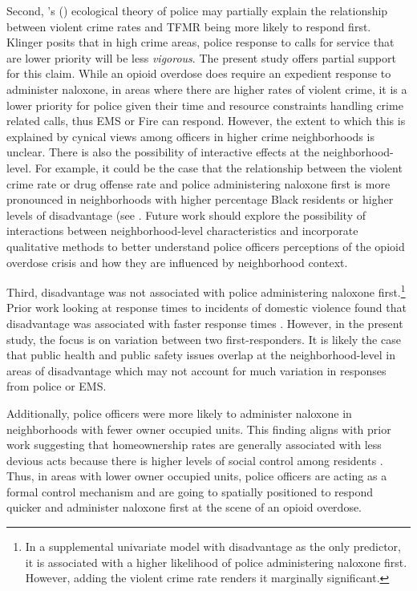 Second, \citeauthor{klinger_negotiating_1997}'s (\citeyear{klinger_negotiating_1997}) ecological theory of police may partially explain the relationship between violent crime rates and TFMR being more likely to respond first. Klinger posits that in high crime areas, police response to calls for service that are lower priority will be less \textit{vigorous}. The present study offers partial support for this claim. While an opioid overdose does require an expedient response to administer naloxone, in areas where there are higher rates of violent crime, it is a lower priority for police given their time and resource constraints handling crime related calls, thus EMS or Fire can respond. However, the extent to which this is explained by cynical views among officers in higher crime neighborhoods is unclear. There is also the possibility of interactive effects at the neighborhood-level. For example, it could be the case that the relationship between the violent crime rate or drug offense rate and police administering naloxone first is more pronounced in neighborhoods with higher percentage Black residents or higher levels of disadvantage (see \cite{donnelly_opioids_2021}. Future work should explore the possibility of interactions between neighborhood-level characteristics and incorporate qualitative methods to better understand police officers perceptions of the opioid overdose crisis and how they are influenced by neighborhood context.

Third, disadvantage was not associated with police administering naloxone first.\footnote{In a supplemental univariate model with disadvantage as the only predictor, it is associated with a higher likelihood of police administering naloxone first. However, adding the violent crime rate renders it marginally significant.} Prior work looking at response times to incidents of domestic violence found that disadvantage was associated with faster response times \parencite{lee_what_2017}. However, in the present study, the focus is on variation between two first-responders. It is likely the case that public health and public safety issues overlap at the neighborhood-level in areas of disadvantage which may not account for much variation in responses from police or EMS. 

Additionally, police officers were more likely to administer naloxone in neighborhoods with fewer owner occupied units. This finding aligns with prior work suggesting that homeownership rates are generally associated with less devious acts because there is higher levels of social control among residents \parencite{sampson_neighborhoods_1997}. Thus, in areas with lower owner occupied units, police officers are acting as a formal control mechanism \parencite{kelling_broken_1982} and are going to spatially positioned to respond quicker and administer naloxone first at the scene of an opioid overdose.

